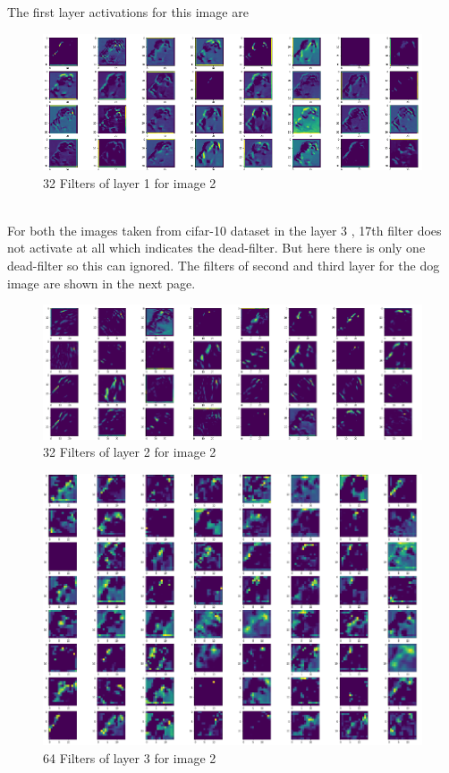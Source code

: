 \newpage\noindent The first layer activations for this image are\\
\begin{figure}[h]
    \centering
    \includegraphics[width=1.1\textwidth]{thesis_template/images/dog1fil1.png}
    \caption{\small 32 Filters of layer 1 for image 2}
    \label{}
    \end{figure}\\
\noindent For both the images taken from cifar-10 dataset in the layer 3 , 17th filter does not activate at all which indicates the dead-filter. But here there is only one dead-filter so this can ignored. The filters of second and third layer for the dog image are shown in the next page.   

\begin{figure}[h]
    \centering
    \includegraphics[width=1.0\textwidth]{thesis_template/images/dog1fil2.png}
    \caption{\small 32 Filters of layer 2 for image 2}
    \label{}
    \end{figure}


\begin{figure}[h]
    \centering
    \includegraphics[width=1.0\textwidth]{thesis_template/images/dog1fil3.png}
    \caption{\small 64 Filters of layer 3 for image 2}
    \label{}
    \end{figure}
